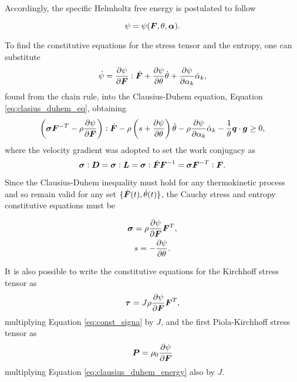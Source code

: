 Accordingly, the specific Helmholtz free energy is postulated to follow
\begin{highlight}
    \begin{equation}
        \psi = \psi(\bm{F}, \theta, \bm{\alpha}).
    \end{equation}
\end{highlight}
To find the constitutive equations for the stress tensor and the entropy, one can substitute
\begin{equation}
    \dot \psi = \frac{\partial \psi}{\partial \bm{F}}:\dot{\bm{F}} + \frac{\partial \psi}{\partial \theta}\dot \theta + \frac{\partial \psi}{\partial \alpha_k}\dot \alpha_k,
\end{equation}
found from the chain rule, into the Clausius-Duhem equation, Equation \eqref{eq:clasius_duhem_eq}, obtaining
\begin{equation}
    \left(\bm{\sigma} \bm{F}^{-T} -\rho\frac{\partial \psi}{\partial \bm{F}}\right):\dot{\bm{F}} -\rho \left(s+\frac{\partial \psi}{\partial \theta}\right)\dot \theta - \rho \frac{\partial \psi}{\partial \alpha_k}\dot\alpha_k - \frac{1}{\theta}\bm{q} \cdot \bm{g}\geq 0,\label{eq:clausius_duhem_energy}
\end{equation}
where the velocity gradient was adopted to set the work conjugacy as
\begin{equation}
    \bm{\sigma} :\bm{D} = \bm{\sigma} :\bm{L} = \bm{\sigma} :\dot{\bm{F}}\bm{F}^{-1} = \bm{\sigma} \bm{F}^{-T}:\bm{F}.
\end{equation}

Since the Clausius-Duhem inequality must hold for any thermokinetic process and so remain valid for any set $\{\dot{\bm{F}}(t),\dot \theta(t)\}$, the Cauchy stress and entropy constitutive equations must be
\begin{highlight}[innertopmargin=-5pt]
    \begin{gather}
        \bm{\sigma} = \rho \frac{\partial \psi}{\partial \bm{F}}\bm{F}^T, \label{eq:const_signa}\\
        s = -\frac{\partial \psi}{\partial \theta}.
    \end{gather}
\end{highlight}

It is also possible to write the constitutive equations for the Kirchhoff stress tensor as
\begin{equation}
    \bm{\tau} = J\rho \frac{\partial \psi}{\partial \bm{F}}\bm{F}^T,
\end{equation}
multiplying Equation \eqref{eq:const_signa} by $J$, and the first Piola-Kirchhoff stress tensor as
\begin{equation}
    \bm{P} = \rho_0 \frac{\partial \psi}{\partial \bm{F}}
\end{equation}
multiplying Equation \eqref{eq:clausius_duhem_energy} also by $J$.

